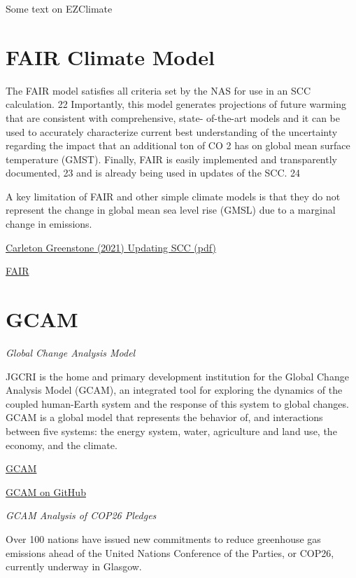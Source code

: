 \documentclass[
]{book}
\begin{document}
Some text on EZClimate

\hypertarget{fair-climate-model}{%
\section{FAIR Climate Model}\label{fair-climate-model}}

The FAIR model satisfies all
criteria set by the NAS for use in an SCC calculation. 22 Importantly, this model
generates projections of future warming that are consistent with comprehensive, state-
of-the-art models and it can be used to accurately characterize current best
understanding of the uncertainty regarding the impact that an additional ton of CO 2
has on global mean surface temperature (GMST). Finally, FAIR is easily implemented
and transparently documented, 23 and is already being used in updates of the SCC. 24

A key limitation of FAIR and other simple climate models is that they do not represent
the change in global mean sea level rise (GMSL) due to a marginal change in emissions.

\href{pdf/Greenstone_2021_Updating_SCC.pdf}{Carleton Greenstone (2021) Updating SCC (pdf)}

\href{https://fair.readthedocs.io/en/latest/}{FAIR}

\hypertarget{gcam}{%
\section{GCAM}\label{gcam}}

\emph{Global Change Analysis Model}

JGCRI is the home and primary development institution for the Global Change Analysis Model (GCAM), an integrated tool for exploring the dynamics of the coupled human-Earth system and the response of this system to global changes. GCAM is a global model that represents the behavior of, and interactions between five systems: the energy system, water, agriculture and land use, the economy, and the climate.

\href{http://www.globalchange.umd.edu/gcam/}{GCAM}

\href{https://github.com/JGCRI/gcam-core}{GCAM on GitHub}

\emph{GCAM Analysis of COP26 Pledges}

Over 100 nations have issued new commitments to reduce greenhouse gas emissions ahead of the United Nations Conference of the Parties, or COP26, currently underway in Glasgow.
\end{document}
